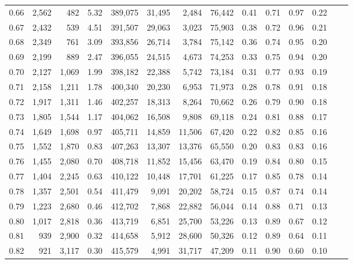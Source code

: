 \begin{tabular}{rrrrrrrrrrrrrr}
0.66 &  2,562 &    482 &     5.32 &  389,075 &   31,495 &   2,484 &  76,442 &  0.41 &  0.71 &  0.97 &      0.22 \\
0.67 &  2,432 &    539 &     4.51 &  391,507 &   29,063 &   3,023 &  75,903 &  0.38 &  0.72 &  0.96 &      0.21 \\
0.68 &  2,349 &    761 &     3.09 &  393,856 &   26,714 &   3,784 &  75,142 &  0.36 &  0.74 &  0.95 &      0.20 \\
0.69 &  2,199 &    889 &     2.47 &  396,055 &   24,515 &   4,673 &  74,253 &  0.33 &  0.75 &  0.94 &      0.20 \\
0.70 &  2,127 &  1,069 &     1.99 &  398,182 &   22,388 &   5,742 &  73,184 &  0.31 &  0.77 &  0.93 &      0.19 \\
0.71 &  2,158 &  1,211 &     1.78 &  400,340 &   20,230 &   6,953 &  71,973 &  0.28 &  0.78 &  0.91 &      0.18 \\
0.72 &  1,917 &  1,311 &     1.46 &  402,257 &   18,313 &   8,264 &  70,662 &  0.26 &  0.79 &  0.90 &      0.18 \\
0.73 &  1,805 &  1,544 &     1.17 &  404,062 &   16,508 &   9,808 &  69,118 &  0.24 &  0.81 &  0.88 &      0.17 \\
0.74 &  1,649 &  1,698 &     0.97 &  405,711 &   14,859 &  11,506 &  67,420 &  0.22 &  0.82 &  0.85 &      0.16 \\
0.75 &  1,552 &  1,870 &     0.83 &  407,263 &   13,307 &  13,376 &  65,550 &  0.20 &  0.83 &  0.83 &      0.16 \\
0.76 &  1,455 &  2,080 &     0.70 &  408,718 &   11,852 &  15,456 &  63,470 &  0.19 &  0.84 &  0.80 &      0.15 \\
0.77 &  1,404 &  2,245 &     0.63 &  410,122 &   10,448 &  17,701 &  61,225 &  0.17 &  0.85 &  0.78 &      0.14 \\
0.78 &  1,357 &  2,501 &     0.54 &  411,479 &    9,091 &  20,202 &  58,724 &  0.15 &  0.87 &  0.74 &      0.14 \\
0.79 &  1,223 &  2,680 &     0.46 &  412,702 &    7,868 &  22,882 &  56,044 &  0.14 &  0.88 &  0.71 &      0.13 \\
0.80 &  1,017 &  2,818 &     0.36 &  413,719 &    6,851 &  25,700 &  53,226 &  0.13 &  0.89 &  0.67 &      0.12 \\
0.81 &    939 &  2,900 &     0.32 &  414,658 &    5,912 &  28,600 &  50,326 &  0.12 &  0.89 &  0.64 &      0.11 \\
0.82 &    921 &  3,117 &     0.30 &  415,579 &    4,991 &  31,717 &  47,209 &  0.11 &  0.90 &  0.60 &      0.10 \\

\end{tabular}

